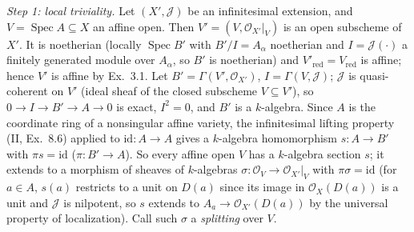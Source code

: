 \documentclass[11pt]{article}
\begin{document}
\emph{Step 1: local triviality.} Let $(X',\mathcal J)$ be an infinitesimal extension, and $V=\operatorname{Spec}A\subseteq X$ an affine open. Then $V'=(V,\mathcal O_{X'}|_V)$ is an open subscheme of $X'$. It is noetherian (locally $\operatorname{Spec}B'$ with $B'/I=A_\alpha$ noetherian and $I=\mathcal J(\cdot)$ a finitely generated module over $A_\alpha$, so $B'$ is noetherian) and $V'_{\mathrm{red}}=V_{\mathrm{red}}$ is affine; hence $V'$ is affine by Ex.~3.1. Let $B'=\Gamma(V',\mathcal O_{X'})$, $I=\Gamma(V,\mathcal J)$; $\mathcal J$ is quasi-coherent on $V'$ (ideal sheaf of the closed subscheme $V\subseteq V'$), so $0\to I\to B'\to A\to0$ is exact, $I^2=0$, and $B'$ is a $k$-algebra. Since $A$ is the coordinate ring of a nonsingular affine variety, the infinitesimal lifting property (II, Ex.~8.6) applied to $\mathrm{id}:A\to A$ gives a $k$-algebra homomorphism $s:A\to B'$ with $\pi s=\mathrm{id}$ ($\pi:B'\to A$). So every affine open $V$ has a $k$-algebra section $s$; it extends to a morphism of sheaves of $k$-algebras $\sigma:\mathcal O_V\to\mathcal O_{X'}|_V$ with $\pi\sigma=\mathrm{id}$ (for $a\in A$, $s(a)$ restricts to a unit on $D(a)$ since its image in $\mathcal O_X(D(a))$ is a unit and $\mathcal J$ is nilpotent, so $s$ extends to $A_a\to\mathcal O_{X'}(D(a))$ by the universal property of localization). Call such $\sigma$ a \emph{splitting} over $V$.
\end{document}
